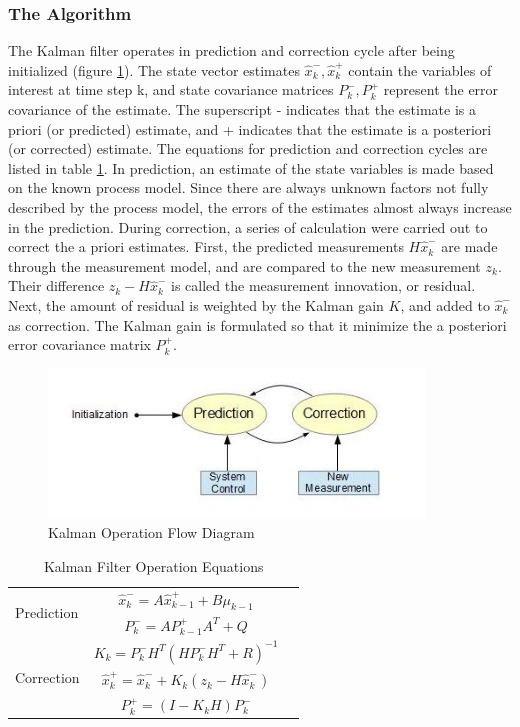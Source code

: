 \subsubsection{The Algorithm}
The Kalman filter operates in prediction and correction cycle after
being initialized (figure \ref{figch2:1}). The state vector estimates
$\hat{x}^-_k, \hat{x}^+_k$ contain the variables of interest at time
step k, and state covariance matrices $P^-_k, P^+_k$ represent the
error covariance of the estimate. The superscript - indicates that the
estimate is a priori (or predicted) estimate, and + indicates that the
estimate is a posteriori (or corrected) estimate. The equations for
prediction and correction cycles are listed in table \ref{tab:KF}. In
prediction, an estimate of the state variables is made based on the
known process model. Since there are always unknown factors not fully
described by the process model, the errors of the estimates almost
always increase in the prediction. During correction, a series of
calculation were carried out to correct the a priori estimates. First,
the predicted measurements $H\hat{x}^-_k$ are made through the
measurement model, and are compared to the new measurement $z_k$.
Their difference $z_k - H\hat{x}^-_k$ is called the measurement
innovation, or residual. Next, the amount of residual is weighted by
the Kalman gain $K$, and added to $\hat{x}^-_k$ as correction. The
Kalman gain is formulated so that it minimize the a posteriori error
covariance matrix $P^+_k$.

\begin{figure}[h]
\centering
\includegraphics[width=10cm, keepaspectratio=true]{./Figures/KalmanOperation.jpg}
\caption{Kalman Operation Flow Diagram}
\label{figch2:1}
\end{figure}

\begin{table}
\caption{Kalman Filter Operation Equations}
\label{tab:KF}
\centering
\begin{tabular}{|l|c r|}
\hline
\multirow{2}{*}{Prediction} 
& $\hat{x}^-_k=A\hat{x}^+_{k-1}+B\mu_{k-1}$ & \stepcounter{equation}\thetag{\theequation}\\
& $P^-_k = AP^+_{k-1}A^T+Q$ & \stepcounter{equation}\thetag{\theequation}\\
\hline
\multirow{3}{*}{Correction}
& $K_k=P^-_kH^T(HP^-_kH^T+R)^{-1}$  & \stepcounter{equation}\thetag{\theequation}\\
& $\hat{x}^+_k = \hat{x}^-_k+K_k(z_k-H\hat{x}^-_k)$ & \stepcounter{equation}\thetag{\theequation}\\
& $P^+_k = (I-K_kH)P^-_k$ & \stepcounter{equation}\thetag{\theequation}\\
\hline
\end{tabular}
\end{table}
\FloatBarrier

